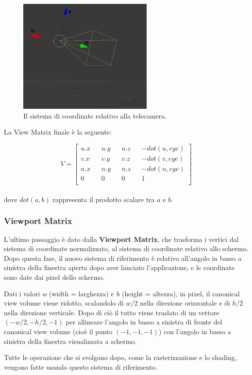 \begin{figure}[htbp]
\centering
\includegraphics[width=0.6\textwidth]{images/frustum/camera-axis.png}
\caption{Il sistema di coordinate relativo alla telecamera.\label{cam-axis}}
\end{figure}

La View Matrix finale è la seguente:

$$V=
\begin{bmatrix}
u.x && u.y && u.z && -dot( u, eye )\\
v.x && v.y && v.z && -dot( v, eye )\\
n.x && n.y && n.z && -dot( n, eye )\\
0 && 0 && 0 && 1\\
\end{bmatrix}
$$\\
dove $dot(a,b)$ rappresenta il prodotto scalare tra $a$ e $b$.


\subsubsection{Viewport Matrix}
L'ultimo passaggio è dato dalla \textbf{Viewport Matrix}, che trasforma i vertici dal sistema di coordinate normalizzato, al sistema di coordinate relativo allo schermo. Dopo questa fase, il nuovo sistema di riferimento è relativo all'angolo in basso a sinistra della finestra aperta dopo aver lanciato l'applicazione, e le coordinate sono date dai pixel dello schermo.

Dati i valori \textit{w} (width = larghezza) e \textit{h} (height = altezza), in pixel, il canonical view volume viene ridotto, scalandolo di $w/2$ nella direzione orizzontale e di $h/2$ nella direzione verticale. Dopo di ciò il tutto viene traslato di un vettore $(-w/2, -h/2, -1)$ per allineare l'angolo in basso a sinistra di fronte del canonical view volume (cioè il punto $(-1,-1,-1)$) con l'angolo in basso a sinistra della finestra visualizzata a schermo.

Tutte le operazione che si svolgono dopo, come la rasterizzazione e lo shading, vengono fatte usando questo sistema di riferimento.

\clearpage